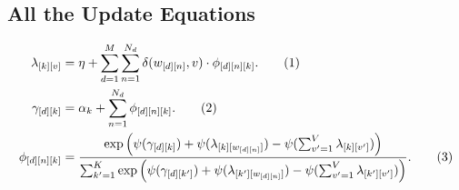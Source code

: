 \documentclass[12pt]{article}
\newcommand\numberthis{\addtocounter{equation}{1}\tag{\theequation}}
\begin{document}
\subsection{All the Update Equations}

\begin{align*}
    \lambda_{[k][v]} &= \eta + \sum_{d=1}^{M} \sum_{n=1}^{N_{d}}
    \delta(w_{[d][n]}, v)\cdot\phi_{[d][n][k]}.
    \numberthis\label{eq:lambdaupdate}
    \\*
    \gamma_{[d][k]} &= \alpha_{k} + \sum_{n=1}^{N_{d}} \phi_{[d][n][k]}.
    \numberthis\label{eq:gammaupdate}
    \\*
    \phi_{[d][n][k]} &= \frac{\exp \left( \psi(\gamma_{[d][k]})
    +
    \psi(\lambda_{[k][w_{[d][n]}]}) - \psi(\sum_{v'=1}^{V} \lambda_{[k][v']})
    \right)}
    {\sum_{k'=1}^{K} \exp \left( \psi(\gamma_{[d][k']})
    +
    \psi(\lambda_{[k'][w_{[d][n]}]}) - \psi(\sum_{v'=1}^{V}
    \lambda_{[k'][v']})
    \right)}.\numberthis\label{eq:phiupdaterepeat}
\end{align*}
\end{document}
